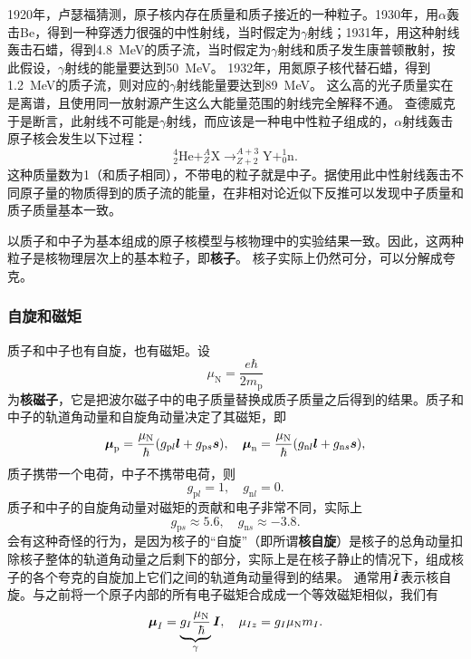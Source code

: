 \documentclass[UTF8, a4paper]{ctexart}
\newcommand*{\nuclear}[3]{^{#2}_{#3}\text{#1}}
\begin{document}
1920年，卢瑟福猜测，原子核内存在质量和质子接近的一种粒子。1930年，用$\alpha$轰击Be，得到一种穿透力很强的中性射线，当时假定为$\gamma$射线；1931年，用这种射线轰击石蜡，得到\SI{4.8}{MeV}的质子流，当时假定为$\gamma$射线和质子发生康普顿散射，按此假设，$\gamma$射线的能量要达到\SI{50}{MeV}。
1932年，用氮原子核代替石蜡，得到\SI{1.2}{MeV}的质子流，则对应的$\gamma$射线能量要达到\SI{89}{MeV}。
这么高的光子质量实在是离谱，且使用同一放射源产生这么大能量范围的射线完全解释不通。
查德威克于是断言，此射线不可能是$\gamma$射线，而应该是一种电中性粒子组成的，$\alpha$射线轰击原子核会发生以下过程：
\[
    \nuclear{He}{4}{2} + \nuclear{X}{A}{Z} \longrightarrow \nuclear{Y}{A+3}{Z+2} + \nuclear{n}{1}{0}.
\]
这种质量数为1（和质子相同），不带电的粒子就是中子。据使用此中性射线轰击不同原子量的物质得到的质子流的能量，在非相对论近似下反推可以发现中子质量和质子质量基本一致。

以质子和中子为基本组成的原子核模型与核物理中的实验结果一致。因此，这两种粒子是核物理层次上的基本粒子，即\textbf{核子}。
核子实际上仍然可分，可以分解成夸克。

\subsubsection{自旋和磁矩}

质子和中子也有自旋，也有磁矩。设
\begin{equation}
    \mu_\text{N} = \frac{e \hbar}{2 m_\text{p}}
\end{equation}
为\textbf{核磁子}，它是把波尔磁子中的电子质量替换成质子质量之后得到的结果。质子和中子的轨道角动量和自旋角动量决定了其磁矩，即
\begin{equation}
    \vb*{\mu}_\text{p} = \frac{\mu_\text{N}}{\hbar} (g_{\text{p} l} \vb*{l} + g_{\text{p} s} \vb*{s}), \quad 
    \vb*{\mu}_\text{n} = \frac{\mu_\text{N}}{\hbar} (g_{\text{n} l} \vb*{l} + g_{\text{n} s} \vb*{s}),
\end{equation}
质子携带一个电荷，中子不携带电荷，则
\begin{equation}
    g_{\text{p}l} = 1, \quad g_{\text{n} l} = 0.
\end{equation}
质子和中子的自旋角动量对磁矩的贡献和电子非常不同，实际上
\begin{equation}
    g_{\text{p} s} \approx 5.6, \quad g_{\text{n} s} \approx -3.8.
\end{equation}
会有这种奇怪的行为，是因为核子的“自旋”（即所谓\textbf{核自旋}）是核子的总角动量扣除核子整体的轨道角动量之后剩下的部分，实际上是在核子静止的情况下，组成核子的各个夸克的自旋加上它们之间的轨道角动量得到的结果。
通常用$\hat{\vb*{I}}$表示核自旋。与之前将一个原子内部的所有电子磁矩合成成一个等效磁矩相似，我们有
\begin{equation}
    \vb*{\mu}_I = \underbrace{g_I \frac{\mu_\text{N}}{\hbar}}_\gamma \vb*{I}, \quad \mu_{Iz} = g_I \mu_\text{N} m_I.
\end{equation}
\end{document}
